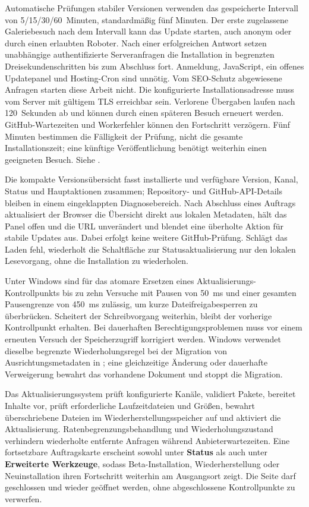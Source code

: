 \documentclass[11pt,a4paper]{article}
\newcommand{\filepath}[1]{\path{#1}}
\newcommand{\ui}[1]{\textbf{#1}}
\begin{document}
Automatische Prüfungen stabiler Versionen verwenden das gespeicherte Intervall
von 5/15/30/60~Minuten, standardmäßig fünf Minuten. Der erste zugelassene
Galeriebesuch nach dem Intervall kann das Update starten, auch anonym oder
durch einen erlaubten Roboter. Nach einer erfolgreichen Antwort setzen
unabhängige authentifizierte Serveranfragen die Installation in begrenzten
Dreisekundenschritten bis zum Abschluss fort. Anmeldung, JavaScript, ein
offenes Updatepanel und Hosting-Cron sind unnötig. Vom SEO-Schutz abgewiesene
Anfragen starten diese Arbeit nicht. Die konfigurierte Installationsadresse
muss vom Server mit gültigem TLS erreichbar sein. Verlorene Übergaben laufen
nach 120~Sekunden ab und können durch einen späteren Besuch erneuert werden.
GitHub-Wartezeiten und Workerfehler können den Fortschritt verzögern. Fünf
Minuten bestimmen die Fälligkeit der Prüfung, nicht die gesamte
Installationszeit;
eine künftige Veröffentlichung benötigt weiterhin einen geeigneten Besuch.
Siehe \filepath{docs/AUTOUPDATE.md}.

Die kompakte Versionsübersicht fasst installierte und verfügbare Version, Kanal,
Status und Hauptaktionen zusammen; Repository- und GitHub-API-Details bleiben in
einem eingeklappten Diagnosebereich. Nach Abschluss eines Auftrags aktualisiert
der Browser die Übersicht direkt aus lokalen Metadaten, hält das Panel offen und
die URL unverändert und blendet eine überholte Aktion für stabile Updates aus.
Dabei erfolgt keine weitere GitHub-Prüfung. Schlägt das Laden fehl, wiederholt
die Schaltfläche zur Statusaktualisierung nur den lokalen Lesevorgang, ohne die
Installation zu wiederholen.

Unter Windows sind für das atomare Ersetzen eines Aktualisierungs-Kontrollpunkts
bis zu zehn Versuche mit Pausen von 50~ms und einer gesamten Pausengrenze von
450~ms zulässig, um kurze Dateifreigabesperren zu überbrücken. Scheitert der
Schreibvorgang weiterhin, bleibt der vorherige Kontrollpunkt erhalten. Bei
dauerhaften Berechtigungsproblemen muss vor einem erneuten Versuch der
Speicherzugriff korrigiert werden. Windows verwendet dieselbe begrenzte
Wiederholungsregel bei der Migration von Ausrichtungsmetadaten in
\filepath{gallery.json}; eine gleichzeitige Änderung oder dauerhafte
Verweigerung bewahrt das vorhandene Dokument und stoppt die Migration.

Das Aktualisierungssystem prüft konfigurierte Kanäle, validiert Pakete, bereitet
Inhalte vor, prüft erforderliche Laufzeitdateien und Größen, bewahrt
überschriebene Dateien im Wiederherstellungsspeicher auf und aktiviert die
Aktualisierung. Ratenbegrenzungsbehandlung und Wiederholungszustand verhindern
wiederholte entfernte Anfragen während Anbieterwartezeiten. Eine fortsetzbare
Auftragskarte erscheint sowohl unter \ui{Status} als auch unter \ui{Erweiterte
Werkzeuge}, sodass Beta-Installation, Wiederherstellung oder Neuinstallation
ihren Fortschritt weiterhin am Ausgangsort zeigt. Die Seite darf geschlossen und
wieder geöffnet werden, ohne abgeschlossene Kontrollpunkte zu verwerfen.
\end{document}
